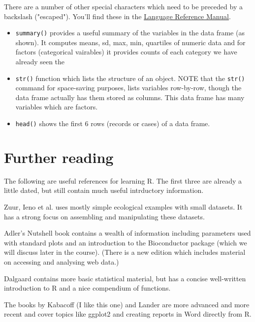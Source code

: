 \documentclass[titlepage]{book}\usepackage{knitr}
\begin{document}
There are a number of other special characters which need to be preceded by a backslash ("escaped").  You'll find these in the \href{https://cran.r-project.org/doc/manuals/r-release/R-lang.html#Literal-constants}{Language Reference Manual}.


\begin{itemize}
\item{\texttt{summary()} provides a useful summary of the variables in the data frame (as shown). It computes means, sd, max, min, quartiles of numeric data and for factors (categorical vairables) it provides counts of each category}
 we have already seen the \item{\texttt{str()} function which lists the structure of an object. NOTE that the \texttt{str()} command for space-saving purposes, lists  variables row-by-row, though the data frame actually has them stored as columns. This data frame has many variables which are factors. }
 \item{\texttt{head()} shows the first 6 rows (records or cases) of a data frame.}
\end{itemize}






\section{Further reading}
The following are useful references for learning R. The first three are already a little dated, but still contain much useful intrductory information.

Zuur, Ieno et al.\cite{Zuur2009a} uses mostly simple ecological examples with small datasets. It has a strong focus on assembling and manipulating these datasets.

Adler's Nutshell book\cite{Adler2010} contains a wealth of information including parameters used with standard plots and an introduction to the Bioconductor package (which we will discuss later in the course). (There is a new edition which includes material on accessing and analysing web data.)

Dalgaard \cite{Dalgaard2008} contains more basic statistical material, but has a concise well-written introduction to R and a nice compendium of functions.

The books by Kabacoff \cite{Kabacoff2015} (I like this one) and Lander \cite{Lander2014} are more advanced and more recent and cover topics like ggplot2 and creating reports in Word directly from R.
\end{document}
